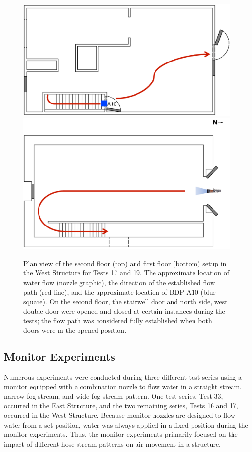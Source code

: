 \documentclass[12pt,oneside]{book}
\begin{document}
\begin{figure}[!ht]
\includegraphics[width=6in]{../Drawings/Specific_Tests/West_Hose_Test_2nd_Floor_Annotated}
\includegraphics[width=6in]{../Drawings/Specific_Tests/West_Hose_Test_19_1st_Floor_Annotated}
\caption[Plan view of the West Structure setup for Tests 17 and 19.]{Plan view of the second floor (top) and first floor (bottom) setup in the West Structure for Tests 17 and 19. The approximate location of water flow (nozzle graphic), the direction of the established flow path (red line), and the approximate location of BDP A10 (blue square). On the second floor, the stairwell door and north side, west double door were opened and closed at certain instances during the tests; the flow path was considered fully established when both doors were in the opened position.}
\label{fig:flow_path_2}
\end{figure}
\FloatBarrier

\subsection{Monitor Experiments}
\label{subsec:monitor_procedure}
Numerous experiments were conducted during three different test series using a monitor equipped with a combination nozzle to flow water in a straight stream, narrow fog stream, and wide fog stream pattern. One test series, Test 33, occurred in the East Structure, and the two remaining series, Tests 16 and 17, occurred in the West Structure. Because monitor nozzles are designed to flow water from a set position, water was always applied in a fixed position during the monitor experiments. Thus, the monitor experiments primarily focused on the impact of different hose stream patterns on air movement in a structure.
\end{document}
